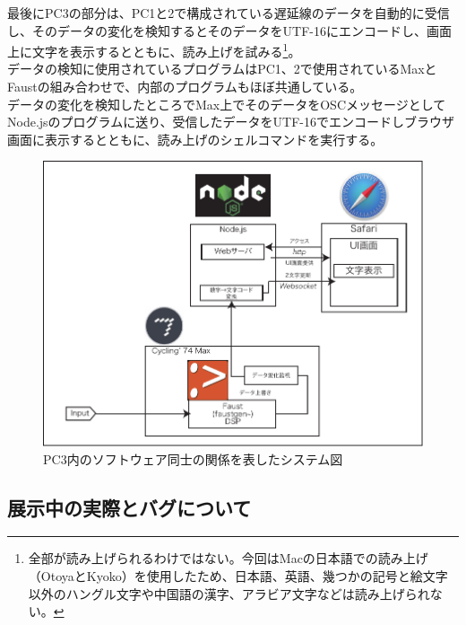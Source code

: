 \documentclass[a4paper,report]{jsbook}
\begin{document}
最後にPC3の部分は、PC1と2で構成されている遅延線のデータを自動的に受信し、そのデータの変化を検知するとそのデータをUTF-16にエンコードし、画面上に文字を表示するとともに、読み上げを試みる\footnote{全部が読み上げられるわけではない。今回はMacの日本語での読み上げ（OtoyaとKyoko）を使用したため、日本語、英語、幾つかの記号と絵文字以外のハングル文字や中国語の漢字、アラビア文字などは読み上げられない。}。\\
データの検知に使用されているプログラムはPC1、2で使用されているMaxとFaustの組み合わせで、内部のプログラムもほぼ共通している。\\
データの変化を検知したところでMax上でそのデータをOSCメッセージとしてNode.jsのプログラムに送り、受信したデータをUTF-16でエンコードしブラウザ画面に表示するとともに、読み上げのシェルコマンドを実行する。

\begin{no-prefix-figure-caption}

\begin{figure}[htbp]
\centering
\includegraphics[width=1.00000\textwidth]{./img/qam2speech_diagram.pdf}
\caption{PC3内のソフトウェア同士の関係を表したシステム図}
\end{figure}

\end{no-prefix-figure-caption}

\subsection{展示中の実際とバグについて}\label{ux5c55ux793aux4e2dux306eux5b9fux969bux3068ux30d0ux30b0ux306bux3064ux3044ux3066}
\end{document}

